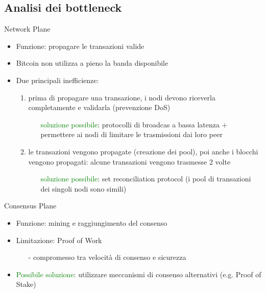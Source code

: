 \documentclass{beamer}
\begin{document}
  \subsection{Analisi dei bottleneck}
  \begin{frame}{Network Plane}
      \begin{itemize}
          \item Funzione: propagare le transazioni valide
          \item Bitcoin non utilizza a pieno la banda disponibile
          \item Due principali inefficienze: 
          \begin{enumerate}
              \item prima di propagare una transazione, i nodi devono riceverla completamente e validarla (prevenzione DoS)
              \begin{itemize}
                  \item[\MVRightarrow] \textcolor{green}{soluzione possibile}:
                  protocolli di broadcas a bassa latenza + permettere ai nodi di limitare le trasmissioni dai loro peer
              \end{itemize}
              \pause
              \item le transazioni vengono propagate (creazione dei pool), poi anche i blocchi vengono propagati: alcune transazioni vengono trasmesse 2 volte
              \begin{itemize}
                  \item[\MVRightarrow] \textcolor{green}{soluzione possibile}: set reconciliation protocol (i pool di transazioni dei singoli nodi sono simili) 
              \end{itemize}
          \end{enumerate}
      \end{itemize}
  \end{frame}
  
  
  
  \begin{frame}{Consensus Plane}
      \begin{itemize}
          \item Funzione: mining e raggiungimento del consenso
          \item Limitazione: Proof of Work 
          \begin{itemize}
              \item[-] compromesso tra velocità di consenso e sicurezza
          \end{itemize}
          \item \textcolor{green}{Possibile soluzione}: utilizzare meccanismi di consenso alternativi (e.g. Proof of Stake) 
      \end{itemize}
  \end{frame}
  
\end{document}
